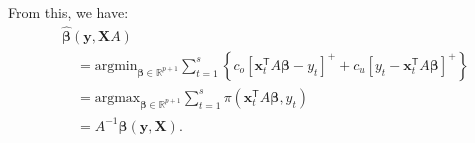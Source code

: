 \documentclass{article}
\begin{document}
    From this, we have:
    \[
        \begin{aligned}
            &\hat{\boldsymbol{\beta}}(\mathbf{y},\mathbf{X}A)\\
            &\quad=\text{argmin}_{\boldsymbol{\beta}\in \mathbb{R}^{p+1}}\displaystyle\sum_{t=1}^s{\left\{c_o\left[\mathbf{x}_t^{\mathsf{T}}A\boldsymbol{\beta}-y_t\right]^{+}+c_u\left[y_t-\mathbf{x}_t^{\mathsf{T}}A\boldsymbol{\beta}\right]^{+}\right\}}\\
            &\quad=\text{argmax}_{\boldsymbol{\beta}\in \mathbb{R}^{p+1}}\displaystyle\sum_{t=1}^s{\pi(\mathbf{x}_t^{\mathsf{T}}A\boldsymbol{\beta},y_t)}\\
            &\quad=A^{-1}\hat{\boldsymbol{\beta}}(\mathbf{y},\mathbf{X}).
        \end{aligned}
    \]
    
\end{document}
